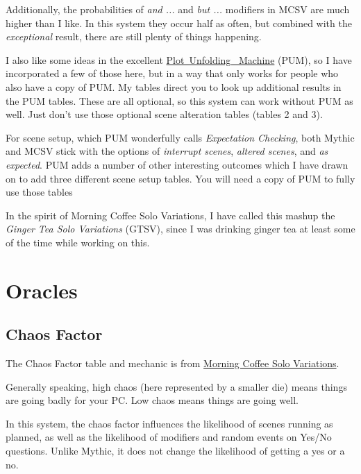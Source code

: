 Additionally, the probabilities of \emph{and ...} and \emph{but ...}
modifiers in MCSV are much higher than I like. In this system they occur half
as often, but combined with the \emph{exceptional} result, there are still
plenty of things happening.

I also like some ideas in the excellent
\href{https://jeansenvaars.itch.io/plot-unfolding-machine}{Plot~Unfolding~
Machine} (PUM), so I have incorporated a few of those here, but in a way that
only works for people who also have a copy of PUM. My tables direct you to look
up additional results in the PUM tables. These are all optional, so this system
can work without PUM as well. Just don't use those optional scene alteration
tables (tables 2 and 3).

For scene setup, which PUM wonderfully calls \emph{Expectation Checking}, both
Mythic and MCSV stick with the options of \emph{interrupt scenes}, \emph{altered
scenes}, and \emph{as expected}. PUM adds a number of other interesting outcomes
which I have drawn on to add three different scene setup tables. You will need a
copy of PUM to fully use those tables

In the spirit of Morning Coffee Solo Variations, I have called this mashup the
\emph{Ginger Tea Solo Variations} (GTSV), since I was drinking ginger tea at
least some of the time while working on this.

\section{Oracles}
\subsection{Chaos Factor}
The Chaos Factor table and mechanic is from
\href{https://aleaiactandaest.blogspot.com/p/downloads.html}{Morning Coffee Solo
Variations}.

Generally speaking, high chaos (here represented by a smaller die) means things
are going badly for your PC. Low chaos means things are going well.

In this system, the chaos factor influences the likelihood of scenes running as
planned, as well as the likelihood of modifiers and random events on Yes/No
questions. Unlike Mythic, it does not change the likelihood of getting a yes or
a no.

